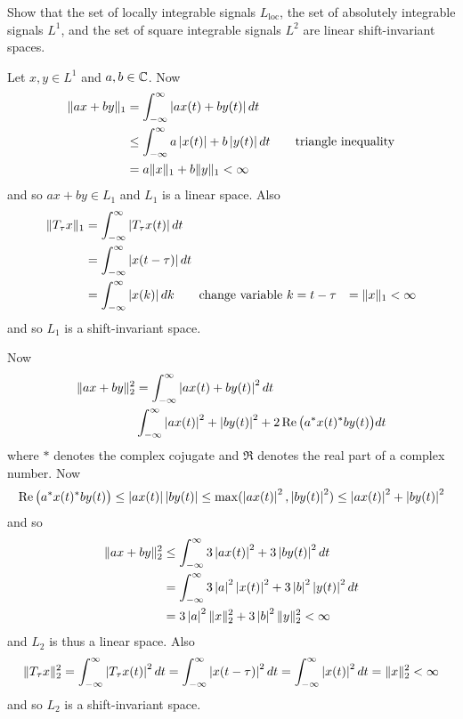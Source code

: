 \begin{excersizelist}
\item \label{exer:L1L2linearshiftinvariant} Show that the set of locally integrable signals $L_{\text{loc}}$, the set of absolutely integrable signals $L^1$, and the set of square integrable signals $L^2$ are linear shift-invariant spaces. 
\begin{solution}
Let $x, y \in L^1$ and $a, b \in {\mathbb C}$.  Now
\begin{align*}
\|a x + b y\|_1 &= \int_{-\infty}^\infty \left\vert ax(t) + by(t) \right\vert dt \\
&\leq \int_{-\infty}^\infty a\left\vert x(t) \right\vert + b\left\vert y(t) \right\vert dt \qquad \text{triangle inequality} \\
&= a \|x\|_1 + b\|y\|_1 < \infty
\end{align*}
and so $ax + by \in L_1$ and $L_1$ is a linear space.  Also
\begin{align*}
\|T_\tau x\|_1 &= \int_{-\infty}^\infty \left\vert  T_\tau x(t)  \right\vert dt \\
&= \int_{-\infty}^\infty \left\vert x(t - \tau) \right\vert dt \\
&= \int_{-\infty}^\infty \left\vert x(k) \right\vert dk \qquad \text{change variable $k = t - \tau$}
&= \|x\|_1 < \infty
\end{align*}
and so $L_1$ is a shift-invariant space.

Now
\begin{align*}
\|a x + b y\|_2^2 &= \int_{-\infty}^\infty \left\vert ax(t) + by(t) \right\vert^2 dt \\
& \int_{-\infty}^\infty \left\vert a x(t) \right\vert^2 + \left\vert  b y(t) \right\vert^2 + 2 \operatorname{Re}\big( a^* x(t)^* b y(t) \big) dt
\end{align*}
where $*$ denotes the complex cojugate and $\Re$ denotes the real part of a complex number.  Now
\[
\operatorname{Re}\big( a^* x(t)^* b y(t) \big) \leq \left\vert a x(t) \right\vert \left\vert b y(t) \right\vert \leq \max(\left\vert a x(t) \right\vert^2, \left\vert b y(t) \right\vert^2) \leq \left\vert a x(t) \right\vert^2 + \left\vert b y(t) \right\vert^2
\]
and so
\begin{align*}
\|a x + b y\|_2^2 &\leq \int_{-\infty}^\infty 3\left\vert a x(t) \right\vert^2 + 3\left\vert  b y(t) \right\vert^2 dt \\
&= \int_{-\infty}^\infty 3\left\vert a \right\vert^2\left\vert x(t) \right\vert^2 + 3\left\vert b \right\vert^2\left\vert  y(t) \right\vert^2 dt \\
&= 3 \left\vert a \right\vert^2 \|x\|_2^2 + 3 \left\vert b \right\vert^2 \|y\|_2^2 < \infty
\end{align*}
and $L_2$ is thus a linear space.  Also
\[
\|T_\tau x\|_2^2 = \int_{-\infty}^\infty \left\vert  T_\tau x(t)  \right\vert^2 dt = \int_{-\infty}^\infty \left\vert x(t - \tau) \right\vert^2 dt = \int_{-\infty}^\infty \left\vert x(t) \right\vert^2 dt = \|x\|_2^2 < \infty
\]
and so $L_2$ is a shift-invariant space.
\end{solution}


\end{excersizelist}
